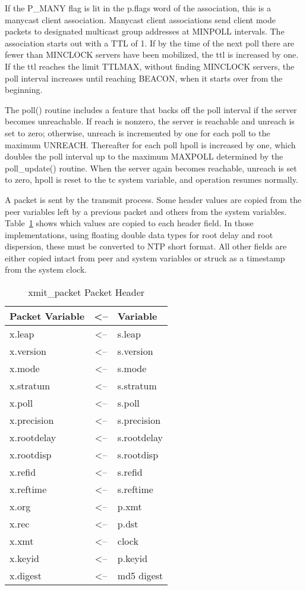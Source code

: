 If the P\_MANY flag is lit in the p.flags word of the association,
this is a manycast client association. Manycast client associations
send client mode packets to designated multicast group addresses at
MINPOLL intervals. The association starts out with a TTL of 1. If
by the time of the next poll there are fewer than MINCLOCK servers
have been mobilized, the ttl is increased by one. If the ttl reaches
the limit TTLMAX, without finding MINCLOCK servers, the poll interval
increases until reaching BEACON, when it starts over from the
beginning.

The poll() routine includes a feature that backs off the poll
interval if the server becomes unreachable. If reach is nonzero, the
server is reachable and unreach is set to zero; otherwise, unreach is
incremented by one for each poll to the maximum UNREACH. Thereafter
for each poll hpoll is increased by one, which doubles the poll
interval up to the maximum MAXPOLL determined by the poll\_update()
routine. When the server again becomes reachable, unreach is set to
zero, hpoll is reset to the tc system variable, and operation resumes
normally.

A packet is sent by the transmit process. Some header values are
copied from the peer variables left by a previous packet and others
from the system variables. Table~\ref{xmit_packet_packet_header} shows which values are copied
to each header field. In those implementations, using floating
double data types for root delay and root dispersion, these must be
converted to NTP short format. All other fields are either copied
intact from peer and system variables or struck as a timestamp from
the system clock.

\begin{table}[htb]
\center
\begin{tabular}{| l | c | l |}
\hline
Packet Variable & <-- & Variable \\
\hline
\hline
x.leap      & <-- & s.leap      \\
x.version   & <-- & s.version   \\
x.mode      & <-- & s.mode      \\
x.stratum   & <-- & s.stratum   \\
x.poll      & <-- & s.poll      \\
x.precision & <-- & s.precision \\
x.rootdelay & <-- & s.rootdelay \\
x.rootdisp  & <-- & s.rootdisp  \\
x.refid     & <-- & s.refid     \\
x.reftime   & <-- & s.reftime   \\
x.org       & <-- & p.xmt       \\
x.rec       & <-- & p.dst       \\
x.xmt       & <-- & clock       \\
x.keyid     & <-- & p.keyid     \\
x.digest    & <-- & md5 digest  \\
\hline
\end{tabular}
\caption{xmit\_packet Packet Header}
\label{xmit_packet_packet_header}
\end{table}

